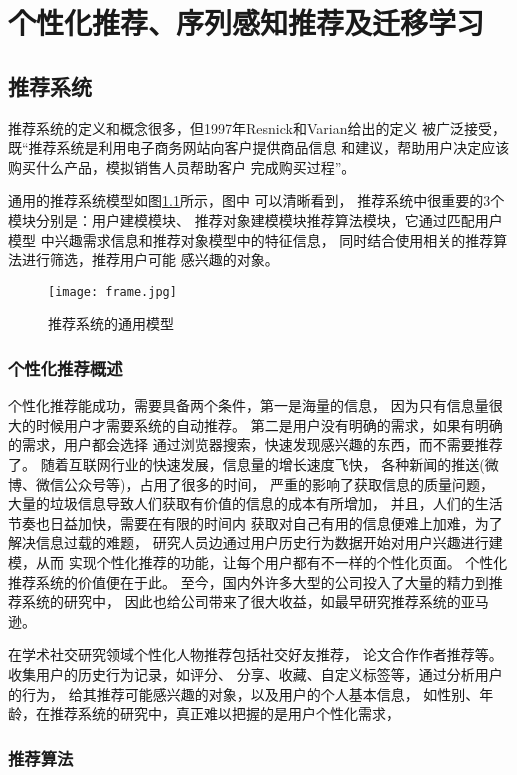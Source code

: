 \chapter{个性化推荐、序列感知推荐及迁移学习}
\section{推荐系统}
推荐系统的定义和概念很多，但1997年Resnick和Varian给出的定义%
被广泛接受，既“推荐系统是利用电子商务网站向客户提供商品信息%
和建议，帮助用户决定应该购买什么产品，模拟销售人员帮助客户%
完成购买过程”。%

通用的推荐系统模型如图\ref{fig:frame}所示，图中%
可以清晰看到，%
推荐系统中很重要的3个模块分别是：用户建模模块、%
推荐对象建模模块推荐算法模块，它通过匹配用户模型%
中兴趣需求信息和推荐对象模型中的特征信息，%
同时结合使用相关的推荐算法进行筛选，推荐用户可能%
感兴趣的对象。
\begin{figure}[htbp] %
  \centering
  \texttt{[image: frame.jpg]}
  \caption{推荐系统的通用模型}
  \label{fig:frame}
\end{figure}




\subsection{个性化推荐概述}
个性化推荐能成功，需要具备两个条件，第一是海量的信息，%
因为只有信息量很大的时候用户才需要系统的自动推荐。%
第二是用户没有明确的需求，如果有明确的需求，用户都会选择%
通过浏览器搜索，快速发现感兴趣的东西，而不需要推荐了。%
随着互联网行业的快速发展，信息量的增长速度飞快，%
各种新闻的推送(微博、微信公众号等)，占用了很多的时间，%
严重的影响了获取信息的质量问题，%
大量的垃圾信息导致人们获取有价值的信息的成本有所增加，%
并且，人们的生活节奏也日益加快，需要在有限的时间内%
获取对自己有用的信息便难上加难，为了解决信息过载的难题，%
研究人员边通过用户历史行为数据开始对用户兴趣进行建模，从而%
实现个性化推荐的功能，让每个用户都有不一样的个性化页面。%
个性化推荐系统的价值便在于此。%
至今，国内外许多大型的公司投入了大量的精力到推荐系统的研究中，%
因此也给公司带来了很大收益，如最早研究推荐系统的亚马逊。%

在学术社交研究领域个性化人物推荐包括社交好友推荐，%
论文合作作者推荐等。收集用户的历史行为记录，如评分、%
分享、收藏、自定义标签等，通过分析用户的行为，%
给其推荐可能感兴趣的对象，以及用户的个人基本信息，%
如性别、年龄，在推荐系统的研究中，真正难以把握的是用户个性化需求，
\subsection{推荐算法}


